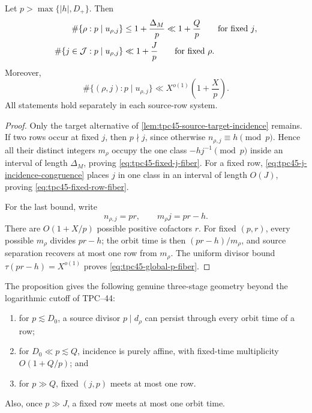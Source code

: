 \begin{proposition}
\label{prop:tpc45-incidence-fibers}
Let \(p>\max\{|h|,D_+\}\).  Then
\begin{align}
 \#\{\rho:p\mid u_{\rho,j}\}
 &\le 1+\frac{\Delta_M}{p}
 \ll 1+\frac Qp
 \qquad\text{for fixed \(j\)},
 \label{eq:tpc45-fixed-j-fiber}\\
 \#\{j\in\mathcal J:p\mid u_{\rho,j}\}
 &\ll 1+\frac Jp
 \qquad\text{for fixed \(\rho\)}.
 \label{eq:tpc45-fixed-row-fiber}
\end{align}
Moreover,
\begin{equation}
 \#\{(\rho,j):p\mid u_{\rho,j}\}
 \ll X^{o(1)}\left(1+\frac Xp\right).
 \label{eq:tpc45-global-p-fiber}
\end{equation}
All statements hold separately in each source-row system.
\end{proposition}

\begin{proof}
Only the target alternative of
\cref{lem:tpc45-source-target-incidence} remains.  If two rows occur at
fixed \(j\), then \(p\nmid j\), since otherwise
\(n_{\rho,j}\equiv h\pmod p\).  Hence all their distinct integers
\(m_\rho\) occupy the one class \(-hj^{-1}\pmod p\) inside an interval
of length \(\Delta_M\), proving \eqref{eq:tpc45-fixed-j-fiber}.  For a
fixed row, \eqref{eq:tpc45-j-incidence-congruence} places \(j\) in one
class in an interval of length \(O(J)\), proving
\eqref{eq:tpc45-fixed-row-fiber}.

For the last bound, write
\begin{equation}
 n_{\rho,j}=pr,
 \qquad
 m_\rho j=pr-h.
 \label{eq:tpc45-p-r-factorization}
\end{equation}
There are \(O(1+X/p)\) possible positive cofactors \(r\).  For fixed
\((p,r)\), every possible \(m_\rho\) divides \(pr-h\); the orbit time is
then \((pr-h)/m_\rho\), and source separation recovers at most one row
from \(m_\rho\).  The uniform divisor bound
\(\tau(pr-h)=X^{o(1)}\) proves \eqref{eq:tpc45-global-p-fiber}.
\end{proof}

The proposition gives the following genuine three-stage geometry beyond
the logarithmic cutoff of TPC--44:
\begin{enumerate}[label=(\alph*)]
 \item for \(p\lesssim D_0\), a source divisor \(p\mid d_\rho\) can
 persist through every orbit time of a row;
 \item for \(D_0\ll p\lesssim Q\), incidence is purely affine, with
 fixed-time multiplicity \(O(1+Q/p)\); and
 \item for \(p\gg Q\), fixed \((j,p)\) meets at most one row.
\end{enumerate}
Also, once \(p\gg J\), a fixed row meets at most one orbit time.

